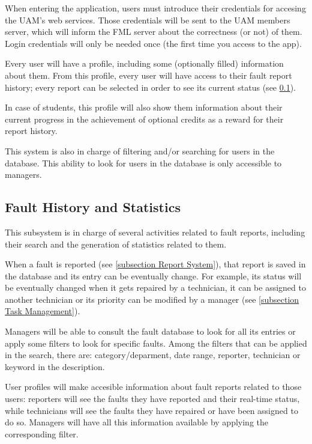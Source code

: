 When entering the application, users must introduce their credentials for accesing the UAM's web services. Those credentials will be sent to the UAM members server, which will inform the FML server about the correctness (or not) of them. Login credentials will only be needed once (the first time you access to the app).

Every user will have a profile, including some (optionally filled) information about them. From this profile, every user will have access to their fault report history; every report can be selected in order to see its current status (see \ref{subsection Fault History and Statistics}). 

In case of students, this profile will also show them information about their current progress in the achievement of optional credits as a reward for their report history.

This system is also in charge of filtering and/or searching for users in the database. This ability to look for users in the database is only accessible to managers.

\subsection{Fault History and Statistics}
\label{subsection Fault History and Statistics}

This subsystem is in charge of several activities related to fault reports, including their search and the generation of statistics related to them.

When a fault is reported (see \ref{subsection Report System}), that report is saved in the database and its entry can be eventually change. For example, its status will be eventually changed when it gets repaired by a technician, it can be assigned to another technician or its priority can be modified by a manager (see \ref{subsection Task Management}).

Managers will be able to consult the fault database to look for all its entries or apply some filters to look for specific faults. Among the filters that can be applied in the search, there are: category/deparment, date range, reporter, technician or keyword in the description.

User profiles will make accesible information about fault reports related to those users: reporters will see the faults they have reported and their real-time status, while technicians will see the faults they have repaired or have been assigned to do so. Managers will have all this information available by applying the corresponding filter.

